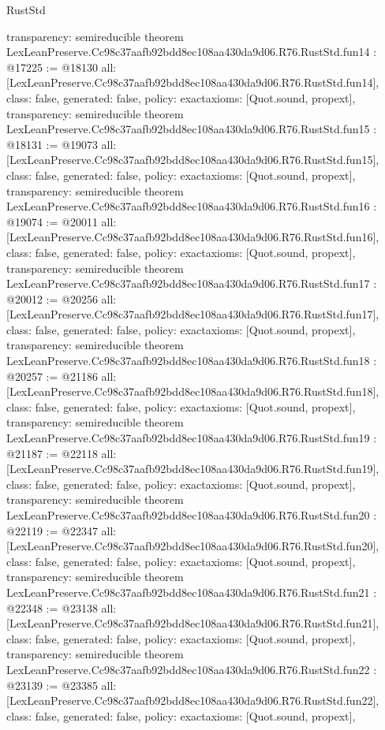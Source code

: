 \begin{lexlean}{RustStd}
\begin{coremodule}
{  transparency: semireducible
}
theorem LexLeanPreserve.Cc98c37aafb92bdd8ec108aa430da9d06.R76.RustStd.fun14 : @17225 := @18130 {
  all: [LexLeanPreserve.Cc98c37aafb92bdd8ec108aa430da9d06.R76.RustStd.fun14],
  class: false,
  generated: false,
  policy: exact{axioms: [Quot.sound, propext]},
  transparency: semireducible
}
theorem LexLeanPreserve.Cc98c37aafb92bdd8ec108aa430da9d06.R76.RustStd.fun15 : @18131 := @19073 {
  all: [LexLeanPreserve.Cc98c37aafb92bdd8ec108aa430da9d06.R76.RustStd.fun15],
  class: false,
  generated: false,
  policy: exact{axioms: [Quot.sound, propext]},
  transparency: semireducible
}
theorem LexLeanPreserve.Cc98c37aafb92bdd8ec108aa430da9d06.R76.RustStd.fun16 : @19074 := @20011 {
  all: [LexLeanPreserve.Cc98c37aafb92bdd8ec108aa430da9d06.R76.RustStd.fun16],
  class: false,
  generated: false,
  policy: exact{axioms: [Quot.sound, propext]},
  transparency: semireducible
}
theorem LexLeanPreserve.Cc98c37aafb92bdd8ec108aa430da9d06.R76.RustStd.fun17 : @20012 := @20256 {
  all: [LexLeanPreserve.Cc98c37aafb92bdd8ec108aa430da9d06.R76.RustStd.fun17],
  class: false,
  generated: false,
  policy: exact{axioms: [Quot.sound, propext]},
  transparency: semireducible
}
theorem LexLeanPreserve.Cc98c37aafb92bdd8ec108aa430da9d06.R76.RustStd.fun18 : @20257 := @21186 {
  all: [LexLeanPreserve.Cc98c37aafb92bdd8ec108aa430da9d06.R76.RustStd.fun18],
  class: false,
  generated: false,
  policy: exact{axioms: [Quot.sound, propext]},
  transparency: semireducible
}
theorem LexLeanPreserve.Cc98c37aafb92bdd8ec108aa430da9d06.R76.RustStd.fun19 : @21187 := @22118 {
  all: [LexLeanPreserve.Cc98c37aafb92bdd8ec108aa430da9d06.R76.RustStd.fun19],
  class: false,
  generated: false,
  policy: exact{axioms: [Quot.sound, propext]},
  transparency: semireducible
}
theorem LexLeanPreserve.Cc98c37aafb92bdd8ec108aa430da9d06.R76.RustStd.fun20 : @22119 := @22347 {
  all: [LexLeanPreserve.Cc98c37aafb92bdd8ec108aa430da9d06.R76.RustStd.fun20],
  class: false,
  generated: false,
  policy: exact{axioms: [Quot.sound, propext]},
  transparency: semireducible
}
theorem LexLeanPreserve.Cc98c37aafb92bdd8ec108aa430da9d06.R76.RustStd.fun21 : @22348 := @23138 {
  all: [LexLeanPreserve.Cc98c37aafb92bdd8ec108aa430da9d06.R76.RustStd.fun21],
  class: false,
  generated: false,
  policy: exact{axioms: [Quot.sound, propext]},
  transparency: semireducible
}
theorem LexLeanPreserve.Cc98c37aafb92bdd8ec108aa430da9d06.R76.RustStd.fun22 : @23139 := @23385 {
  all: [LexLeanPreserve.Cc98c37aafb92bdd8ec108aa430da9d06.R76.RustStd.fun22],
  class: false,
  generated: false,
  policy: exact{axioms: [Quot.sound, propext]},
}
\end{coremodule}
\end{lexlean}
